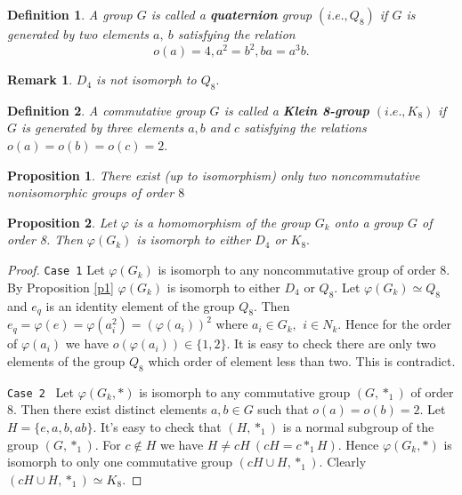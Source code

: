 \documentclass[12pt,reqno]{amsart}
\newtheorem{defn}{Definition}
\newtheorem{pro}{Proposition}
\newtheorem{rem}{Remark}
\numberwithin{equation}{section}
\begin{document}
\begin{defn}\label{d2} A group $G$ is called a
\textbf{quaternion} group $(i.e., Q_{8})$ if $G$ is generated by
two elements $a,\ b$ satisfying the relation
$$o(a)=4, a^{2}=b^{2}, ba=a^{3}b.$$
\end{defn}

\begin{rem}\label{r1}\emph{\cite{2}}  $D_{4}$ is not isomorph to $Q_{8}.$
\end{rem}

\begin{defn}\label{d9} A commutative group $G$ is called a \textbf{Klein 8-group}
 $(i.e.,K_{8})$ if $G$ is generated by three
elements $a, b$ and $c$ satisfying the relations
$o(a)=o(b)=o(c)=2.$
\end{defn}

\begin{pro}\label{p1.}\emph{\cite{2}}  There exist (up to isomorphism)
only two noncommutative nonisomorphic groups of order $8$
\end{pro}

 \begin{pro}\label{p2.} Let $\varphi$ is a homomorphism of the group $G_{k}$ onto a group
 $G$ of order 8. Then
 $\varphi(G_{k})$ is isomorph to either $D_{4}$ or $K_{8}.$
\end{pro}

\begin{proof}

\texttt{Case 1} Let $\varphi(G_{k})$ is isomorph to any
noncommutative group of order $8$. By Proposition \ref{p1}
$\varphi(G_{k})$ is isomorph to either $D_{4}$ or $Q_{8}.$ Let
$\varphi(G_{k})\simeq Q_{8}$ and $e_{q}$ is an identity element of
the group $Q_{8}$. Then
 $e_{q}=\varphi(e)=\varphi(a_{i}^{2})=(\varphi(a_{i}))^{2}$ where
 $a_{i}\in G_{k}, \,\ i\in N_{k}.$
 Hence for the order of $\varphi(a_{i})$ we have $o(\varphi(a_{i}))\in
 \{1,2\}.$ It is easy to check there are only two elements of the
 group $Q_{8}$ which order of element less than two. This is
 contradict.

  \texttt{Case 2} \ Let $\varphi(G_{k},\ast)$ is isomorph to any
commutative group $(G,\ast_{1})$ of order $8$. Then there exist
distinct elements $a,b \in G$ such that $o(a)=o(b)=2.$ Let
$H=\{e,a,b,ab\}.$ It's easy to check that $(H ,\ast_{1})$ is a
normal subgroup of the group $(G,\ast_{1}).$ For $c\notin H$ we
have $H\neq cH \ (cH=c\ast_{1}H).$ Hence $\varphi(G_{k},\ast)$ is
isomorph to only one commutative group $(cH\cup H,\ast_{1}).$
Clearly $(cH\cup H,\ast_{1})\simeq K_{8}.$
\end{proof}
\end{document}
